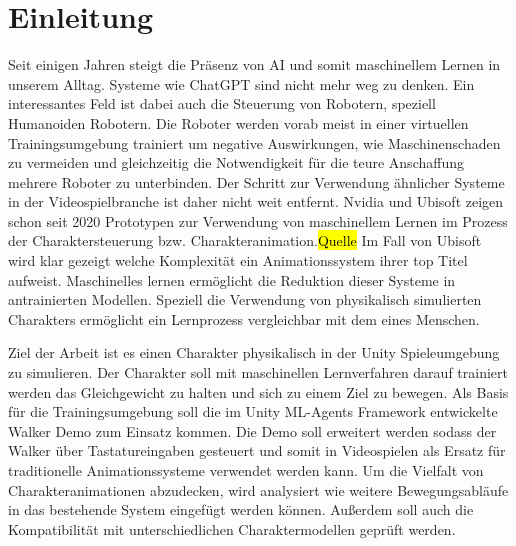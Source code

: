 \chapter{Einleitung}
\label{sec:einleitung}
Seit einigen Jahren steigt die Präsenz von AI und somit maschinellem Lernen in unserem Alltag. Systeme wie ChatGPT sind nicht mehr weg zu denken. Ein interessantes Feld ist dabei auch die Steuerung von Robotern, speziell Humanoiden Robotern. Die Roboter werden vorab meist in einer virtuellen Trainingsumgebung trainiert um negative Auswirkungen, wie Maschinenschaden zu vermeiden und gleichzeitig die Notwendigkeit für die teure Anschaffung mehrere Roboter zu unterbinden. Der Schritt zur Verwendung ähnlicher Systeme in der Videospielbranche ist daher nicht weit entfernt. Nvidia und Ubisoft zeigen schon seit 2020 Prototypen zur Verwendung von maschinellem Lernen im Prozess der Charaktersteuerung bzw. Charakteranimation.\hl{Quelle} Im Fall von Ubisoft wird klar gezeigt welche Komplexität ein Animationssystem ihrer top Titel aufweist. Maschinelles lernen ermöglicht die Reduktion dieser Systeme in antrainierten Modellen. Speziell die Verwendung von physikalisch simulierten Charakters ermöglicht ein Lernprozess vergleichbar mit dem eines Menschen.

Ziel der Arbeit ist es einen Charakter physikalisch in der Unity Spieleumgebung zu simulieren. Der Charakter soll mit maschinellen Lernverfahren darauf trainiert werden das Gleichgewicht zu halten und sich zu einem Ziel zu bewegen. Als Basis für die Trainingsumgebung soll die im Unity ML-Agents Framework entwickelte Walker Demo zum Einsatz kommen. Die Demo soll erweitert werden sodass der Walker über Tastatureingaben gesteuert und somit in Videospielen als Ersatz für traditionelle Animationssysteme verwendet werden kann. Um die Vielfalt von Charakteranimationen abzudecken, wird analysiert wie weitere Bewegungsabläufe in das bestehende System eingefügt werden können. Außerdem soll auch die Kompatibilität mit unterschiedlichen Charaktermodellen geprüft werden.

